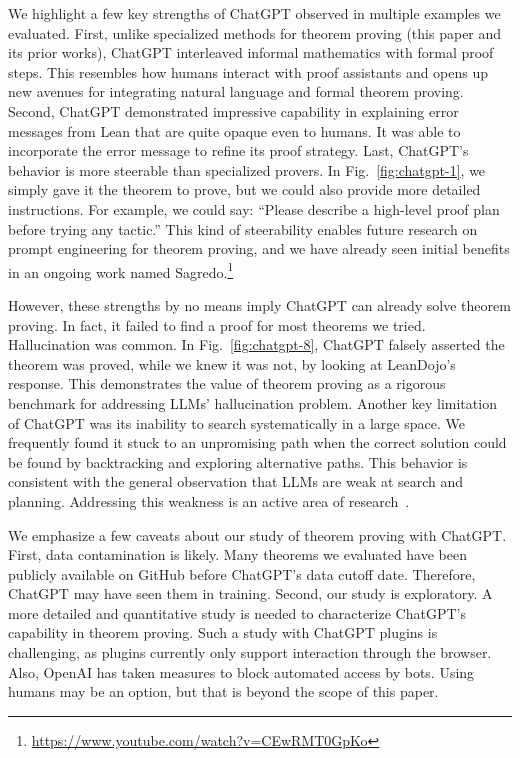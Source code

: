 We highlight a few key strengths of ChatGPT observed in multiple examples we evaluated. First, unlike specialized methods for theorem proving (this paper and its prior works), ChatGPT interleaved informal mathematics with formal proof steps. This resembles how humans interact with proof assistants and opens up new avenues for integrating natural language and formal theorem proving. Second, ChatGPT demonstrated impressive capability in explaining error messages from Lean that are quite opaque even to humans. It was able to incorporate the error message to refine its proof strategy. Last, ChatGPT's behavior is more steerable than specialized provers. In Fig.~\ref{fig:chatgpt-1}, we simply gave it the theorem to prove, but we could also provide more detailed instructions. For example, we could say: ``Please describe a high-level proof plan before trying any tactic.'' This kind of steerability enables future research on prompt engineering for theorem proving, and we have already seen initial benefits in an ongoing work named Sagredo.\footnote{\url{https://www.youtube.com/watch?v=CEwRMT0GpKo}} 

However, these strengths by no means imply ChatGPT can already solve theorem proving. In fact, it failed to find a proof for most theorems we tried. Hallucination was common. In Fig.~\ref{fig:chatgpt-8}, ChatGPT falsely asserted the theorem was proved, while we knew it was not, by looking at LeanDojo's response. This demonstrates the value of theorem proving as a rigorous benchmark for addressing LLMs' hallucination problem. Another key limitation of ChatGPT was its inability to search systematically in a large space. We frequently found it stuck to an unpromising path when the correct solution could be found by backtracking and exploring alternative paths. This behavior is consistent with the general observation that LLMs are weak at search and planning. Addressing this weakness is an active area of research~\cite{yao2023tree}.

We emphasize a few caveats about our study of theorem proving with ChatGPT. First, data contamination is likely. Many theorems we evaluated have been publicly available on GitHub before ChatGPT's data cutoff date. Therefore, ChatGPT may have seen them in training. Second, our study is exploratory. A more detailed and quantitative study is needed to characterize ChatGPT's capability in theorem proving. Such a study with ChatGPT plugins is challenging, as plugins currently only support interaction through the browser. Also, OpenAI has taken measures to block automated access by bots. Using humans may be an option, but that is beyond the scope of this paper.


